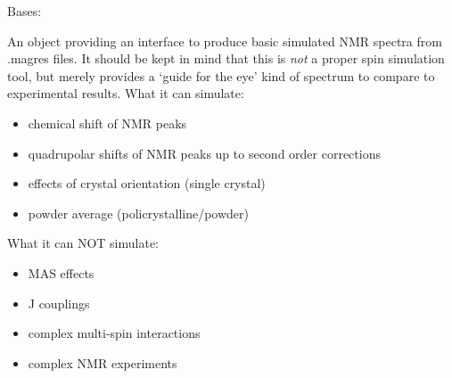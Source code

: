 \documentclass[letterpaper,10pt,english]{sphinxmanual}
\begin{document}
\begin{fulllineitems}
\label{doctree/soprano.calculate.nmr.nmr:soprano.calculate.nmr.nmr.NMRCalculator}
Bases: 

An object providing an interface to produce basic simulated NMR spectra
from .magres files. It should be kept in mind that this is \emph{not} a proper
spin simulation tool, but merely provides a `guide for the eye' kind of
spectrum to compare to experimental results. What it can simulate:
\begin{itemize}
\item {} 
chemical shift of NMR peaks

\item {} 
quadrupolar shifts of NMR peaks up to second order corrections

\item {} 
effects of crystal orientation (single crystal)

\item {} 
powder average (policrystalline/powder)

\end{itemize}

What it can NOT simulate:
\begin{itemize}
\item {} 
MAS effects

\item {} 
J couplings

\item {} 
complex multi-spin interactions

\item {} 
complex NMR experiments

\end{itemize}


\end{fulllineitems}
\end{document}
